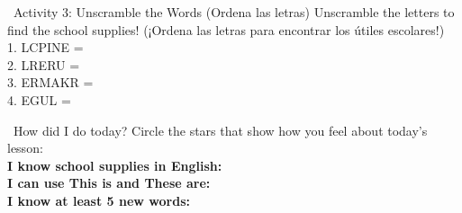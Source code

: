 \begin{activity}{ \ Activity 3: Unscramble the Words (Ordena las letras)}
  Unscramble the letters to find the school supplies! (¡Ordena las letras para encontrar los útiles escolares!)\\[1em]
  1. LCPINE = \answerline[4cm]\\
  2. LRERU = \answerline[4cm]\\
  3. ERMAKR = \answerline[4cm]\\
  4. EGUL = \answerline[4cm]
\end{activity}

\vspace{1em}
\begin{grammartip}{ \ How did I do today?}
  Circle the stars that show how you feel about today's lesson:\\[6pt]
  \textbf{I know school supplies in English:} \selfcheck[0] \\[4pt]
  \textbf{I can use This is and These are:} \selfcheck[0] \\[4pt]
  \textbf{I know at least 5 new words:} \selfcheck[0]
\end{grammartip}
